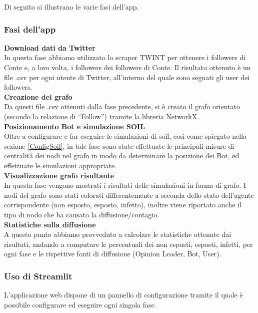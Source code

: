       Di seguito si illustrano le varie fasi dell’app.
        \subsubsection{Fasi dell'app}
          
          \textbf{Download dati da Twitter}
          \\
          In questa fase abbiamo utilizzato lo scraper TWINT per ottenere i followers di Conte e, a loro volta, i followers dei followers di Conte. Il risultato ottenuto è un file .csv per ogni utente di Twitter, all'interno del quale sono segnati gli user dei followers.
          \\
          \textbf{Creazione del grafo}
          \\
          Da questi file .csv ottenuti dalla fase precedente, si è creato il grafo orientato (secondo la relazione di “Follow”) tramite la libreria NetworkX.
          \\
          \textbf{Posizionamento Bot e simulazione SOIL}
          \\
          Oltre a configurare e far eseguire le simulazioni di soil, così come spiegato nella sezione \ref{ConfigSoil}, in tale fase sono state effettuate le principali misure di centralità dei nodi nel grafo in modo da determinare la posizione dei Bot, ed effettuate le simulazioni appropriate.
          \\
          \textbf{Visualizzazione grafo risultante}
          \\
          In questa fase vengono mostrati i risultati delle simulazioni in forma di grafo. I nodi del grafo sono stati colorati differentemente a seconda dello stato dell’agente corrispondente (non esposto, esposto, infetto), inoltre viene riportato anche il tipo di nodo che ha causato la diffusione/contagio.
          \\
          \textbf{Statistiche sulla diffusione}
          \\
          A questo punto abbiamo provveduto a calcolare le statistiche ottenute dai risultati, andando a computare le percentuali dei non esposti, esposti, infetti, per ogni fase e le rispettive fonti di diffusione (Opinion Leader, Bot, User).
        \subsubsection{Uso di Streamlit}
          L'applicazione web dispone di un pannello di configurazione tramite il quale è possibile configurare ed eseguire ogni singola fase.
          
